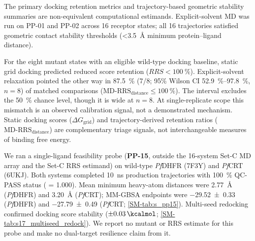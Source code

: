 \documentclass[journal=jcisd8,manuscript=article,layout=traditional]{achemso}
\begin{document}
The primary docking retention metrics and trajectory-based geometric stability summaries are non-equivalent computational estimands. Explicit-solvent MD was run on PP-01 and PP-02 across 16 receptor states; all 16 trajectories satisfied geometric contact stability thresholds (\qty{<3.5}{\angstrom} minimum protein--ligand distance).

For the eight mutant states with an eligible wild-type docking baseline, static grid docking predicted reduced score retention ($RRS < \qty{100}{\percent}$). Explicit-solvent relaxation pointed the other way in \qty{87.5}{\percent} (7/8; 95\% Wilson CI \qtyrange{52.9}{97.8}{\percent}, $n=\num{8}$) of matched comparisons ($\mathrm{MD\text{-}RRS}_{\mathrm{distance}} \le \qty{100}{\percent}$). The interval excludes the \qty{50}{\percent} chance level, though it is wide at $n=\num{8}$. At single-replicate scope this mismatch is an observed calibration signal, not a demonstrated mechanism. Static docking scores ($\Delta G_{\mathrm{grid}}$) and trajectory-derived retention ratios ($\mathrm{MD\text{-}RRS}_{\mathrm{distance}}$) are complementary triage signals, not interchangeable measures of binding free energy.

We ran a single-ligand feasibility probe (\textbf{PP-15}, outside the 16-system Set-C MD array and the Set-C RRS estimand) on wild-type \textit{Pf}DHFR (7F3Y) and \textit{Pf}CRT (6UKJ). Both systems completed \qty{10}{\ns} production trajectories with \qty{100}{\percent} QC-PASS status ( = \num{1.000}). Mean minimum heavy-atom distances were \qty{2.77}{\angstrom} (\textit{Pf}DHFR) and \qty{3.20}{\angstrom} (\textit{Pf}CRT); MM-GBSA endpoints were \qty{-29.52 \pm 0.33}{\kcalmol} (\textit{Pf}DHFR) and \qty{-27.79 \pm 0.49}{\kcalmol} (\textit{Pf}CRT; \cref{SM-tab:s_pp15}). Multi-seed redocking confirmed docking score stability ($\pm\qty{0.03}{\kcalmol}$; \cref{SM-tab:s17_multiseed_redock}). We report no mutant or RRS estimate for this probe and make no dual-target resilience claim from it.
\end{document}
